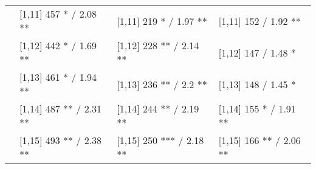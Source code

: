 \begin{table}
\begin{tabular}[t]{llll}
 & {}[1,11] 457 * / 2.08 ** & {}[1,11] 219 * / 1.97 ** & {}[1,11] 152  / 1.92 **\\
 & {}[1,12] 442 * / 1.69 ** & {}[1,12] 228 ** / 2.14 ** & {}[1,12] 147  / 1.48 *\\
\addlinespace
 & {}[1,13] 461 * / 1.94 ** & {}[1,13] 236 ** / 2.2 ** & {}[1,13] 148  / 1.45 *\\
 & {}[1,14] 487 ** / 2.31 ** & {}[1,14] 244 ** / 2.19 ** & {}[1,14] 155 * / 1.91 **\\
 & {}[1,15] 493 ** / 2.38 ** & {}[1,15] 250 *** / 2.18 ** & {}[1,15] 166 ** / 2.06 **\\
\bottomrule
\end{tabular}
\end{table}
